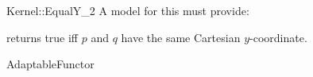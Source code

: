 \begin{ccRefFunctionObjectConcept}{Kernel::EqualY_2}
A model for this must provide:


{returns true iff $p$ and $q$ have the same Cartesian $y$-coordinate.}

\ccRefines
AdaptableFunctor

\ccSeeAlso
{}\\

\end{ccRefFunctionObjectConcept}
